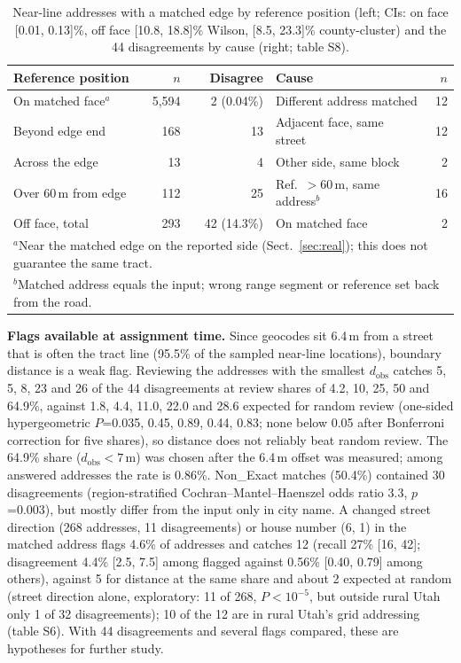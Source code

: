 \documentclass[runningheads]{llncs}
\begin{document}
\begin{table}[t]
\centering
\caption{Near-line addresses with a matched edge by reference position (left; CIs: on face [0.01, 0.13]\%, off face [10.8, 18.8]\% Wilson, [8.5, 23.3]\% county-cluster) and the 44 disagreements by cause (right; table S8).}
\label{tab:cases}
\footnotesize\setlength{\tabcolsep}{3pt}
\begin{tabular}{lrr@{\hspace{12pt}}lr}
\toprule
Reference position & $n$ & Disagree & Cause & $n$ \\
\midrule
On matched face$^a$ & 5{,}594 & 2 (0.04\%) & Different address matched & 12 \\
Beyond edge end & 168 & 13 & Adjacent face, same street & 12 \\
Across the edge & 13 & 4 & Other side, same block & 2 \\
Over 60\,m from edge & 112 & 25 & Ref.\ $>$60\,m, same address$^b$ & 16 \\
Off face, total & 293 & 42 (14.3\%) & On matched face & 2 \\
\bottomrule
\multicolumn{5}{l}{\scriptsize $^a$Near the matched edge on the reported side (Sect.~\ref{sec:real}); this does not guarantee the same tract.}\\
\multicolumn{5}{l}{\scriptsize $^b$Matched address equals the input; wrong range segment or reference set back from the road.}
\end{tabular}
\end{table}

\textbf{Flags available at assignment time.} Since geocodes sit 6.4\,m from a street that is often the tract line (95.5\% of the sampled near-line locations), boundary distance is a weak flag. Reviewing the addresses with the smallest $d_{\mathrm{obs}}$ catches 5, 5, 8, 23 and 26 of the 44 disagreements at review shares of 4.2, 10, 25, 50 and 64.9\%, against 1.8, 4.4, 11.0, 22.0 and 28.6 expected for random review (one-sided hypergeometric $P$=0.035, 0.45, 0.89, 0.44, 0.83; none below 0.05 after Bonferroni correction for five shares), so distance does not reliably beat random review. The 64.9\% share ($d_{\mathrm{obs}}<7$\,m) was chosen after the 6.4\,m offset was measured; among answered addresses the rate is 0.86\%. Non\_Exact matches (50.4\%) contained 30 disagreements (region-stratified Cochran--Mantel--Haenszel odds ratio 3.3, $p$=0.003), but mostly differ from the input only in city name. A changed street direction (268 addresses, 11 disagreements) or house number (6, 1) in the matched address flags 4.6\% of addresses and catches 12 (recall 27\% [16, 42]; disagreement 4.4\% [2.5, 7.5] among flagged against 0.56\% [0.40, 0.79] among others), against 5 for distance at the same share and about 2 expected at random (street direction alone, exploratory: 11 of 268, $P<10^{-5}$, but outside rural Utah only 1 of 32 disagreements); 10 of the 12 are in rural Utah's grid addressing (table S6). With 44 disagreements and several flags compared, these are hypotheses for further study.
\end{document}
